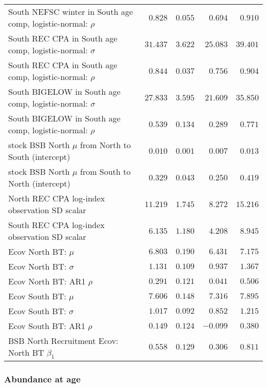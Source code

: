 \documentclass[
]{article}
\begin{document}
\begin{landscape}
\begin{longtable}[t]{lrrrr}
South NEFSC winter in South age comp, logistic-normal: $\rho$ & $0.828$ & $0.055$ & $0.694$ & $0.910$\\
South REC CPA in South age comp, logistic-normal: $\sigma$ & $31.437$ & $3.622$ & $25.083$ & $39.401$\\
South REC CPA in South age comp, logistic-normal: $\rho$ & $0.844$ & $0.037$ & $0.756$ & $0.904$\\
\addlinespace
South BIGELOW in South age comp, logistic-normal: $\sigma$ & $27.833$ & $3.595$ & $21.609$ & $35.850$\\
South BIGELOW in South age comp, logistic-normal: $\rho$ & $0.539$ & $0.134$ & $0.289$ & $0.771$\\
stock BSB North $\mu$ from North to South (intercept) & $0.010$ & $0.001$ & $0.007$ & $0.013$\\
stock BSB North $\mu$ from South to North (intercept) & $0.329$ & $0.043$ & $0.250$ & $0.419$\\
North REC CPA log-index observation SD scalar & $11.219$ & $1.745$ & $8.272$ & $15.216$\\
\addlinespace
South REC CPA log-index observation SD scalar & $6.135$ & $1.180$ & $4.208$ & $8.945$\\
Ecov North BT: $\mu$ & $6.803$ & $0.190$ & $6.431$ & $7.175$\\
Ecov North BT: $\sigma$ & $1.131$ & $0.109$ & $0.937$ & $1.367$\\
Ecov North BT: AR1 $\rho$ & $0.291$ & $0.121$ & $0.041$ & $0.506$\\
Ecov South BT: $\mu$ & $7.606$ & $0.148$ & $7.316$ & $7.895$\\
\addlinespace
Ecov South BT: $\sigma$ & $1.017$ & $0.092$ & $0.852$ & $1.215$\\
Ecov South BT: AR1 $\rho$ & $0.149$ & $0.124$ & $-0.099$ & $0.380$\\
BSB North Recruitment Ecov: North BT $\beta_1$ & $0.558$ & $0.129$ & $0.306$ & $0.811$\\*
\end{longtable}
\end{landscape}

\hypertarget{abundance-at-age}{%
\subsubsection{Abundance at age}\label{abundance-at-age}}
\end{document}
